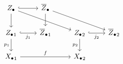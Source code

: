 \documentclass[crop,dvisvgm]{standalone}
\begin{document}
\[\begin {tikzcd}
        Z_\bullet 
          \ar [r,hook]
          \ar [d]
          \ar [drr]
        & \overline {Z}_\bullet 
          \ar [d]
          \ar [drr]
      \\{Z_\bullet }_1
          \ar [r,hook,swap,"j_1"]
          \ar [d,swap,"p_1"]
        & {\overline {Z}_\bullet }_1
        & {Z_\bullet }_2
          \ar [r,hook,swap,"j_2"]
          \ar [d,swap,"p_2"]
        & {\overline {Z}_\bullet }_2
      \\{X_\bullet }_1
          \ar [rr,"f"]
        && {X_\bullet }_2
      \end {tikzcd}\]
\end{document}

